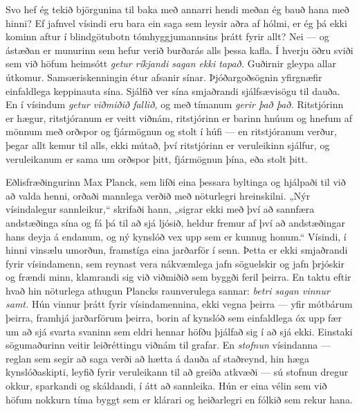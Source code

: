 Svo hef ég tekið björgunina til baka með annarri hendi meðan ég bauð hana með hinni? Ef jafnvel vísindi eru bara ein saga sem leysir aðra af hólmi, er ég þá ekki kominn aftur í blindgötubotn tómhyggjumannsins þrátt fyrir allt? Nei — og ástæðan er munurinn sem hefur verið burðarás alls þessa kafla. Í hverju öðru sviði sem við höfum heimsótt \emph{getur ríkjandi sagan ekki tapað.} Guðirnir gleypa allar útkomur. Samsæriskenningin étur afsanir sínar. Þjóðargoðsögnin yfirgnæfir einfaldlega keppinauta sína. Sjálfið ver sína smjaðrandi sjálfsævisögu til dauða. En í vísindum \emph{getur viðmiðið fallið,} og með tímanum \emph{gerir það það.} Ritstjórinn er hægur, ritstjóranum er veitt viðnám, ritstjórinn er barinn hnúum og hnefum af mönnum með orðspor og fjármögnun og stolt í húfi — en ritstjóranum verður, þegar allt kemur til alls, ekki mútað, því ritstjórinn er veruleikinn sjálfur, og veruleikanum er sama um orðspor þitt, fjármögnun þína, eða stolt þitt.

Eðlisfræðingurinn Max Planck, sem lifði eina þessara byltinga og hjálpaði til við að valda henni, orðaði mannlega verðið með nöturlegri hreinskilni. „Nýr vísindalegur sannleikur,“ skrifaði hann, „sigrar ekki með því að sannfæra andstæðinga sína og fá þá til að sjá ljósið, heldur fremur af því að andstæðingar hans deyja á endanum, og ný kynslóð vex upp sem er kunnug honum.“ Vísindi, í hinni vinsælu umorðun, framstíga eina jarðarför í senn. Þetta er ekki smjaðrandi fyrir vísindamenn, sem reynast vera nákvæmlega jafn söguelskir og jafn þrjóskir og frændi minn, klamrandi sig við viðmiðið sem byggði feril þeirra. En taktu eftir hvað hin nöturlega athugun Plancks raunverulega sannar: \emph{betri sagan vinnur samt.} Hún vinnur þrátt fyrir vísindamennina, ekki vegna þeirra — yfir mótbárum þeirra, framhjá jarðarförum þeirra, borin af kynslóð sem einfaldlega óx upp fær um að sjá svarta svaninn sem eldri hennar höfðu þjálfað sig í að sjá ekki. Einstaki sögumaðurinn veitir leiðréttingu viðnám til grafar. En \emph{stofnun} vísindanna — reglan sem segir að saga verði að hætta á dauða af staðreynd, hin hæga kynslóðaskipti, leyfið fyrir veruleikann til að greiða atkvæði — sú stofnun dregur okkur, sparkandi og skáldandi, í átt að sannleika. Hún er eina vélin sem við höfum nokkurn tíma byggt sem er klárari og heiðarlegri en fólkið sem rekur hana.

